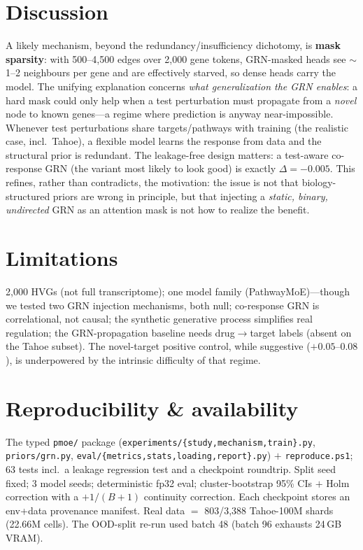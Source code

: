 \documentclass[11pt]{article}
\begin{document}
\section{Discussion}
A likely mechanism, beyond the redundancy/insufficiency dichotomy, is \textbf{mask sparsity}: with
500--4{,}500 edges over 2{,}000 gene tokens, GRN-masked heads see $\sim$1--2 neighbours per gene and are
effectively starved, so dense heads carry the model. The unifying explanation concerns \emph{what
generalization the GRN enables}: a hard mask could only help when a test perturbation must propagate from
a \emph{novel} node to known genes---a regime where prediction is anyway near-impossible. Whenever test
perturbations share targets/pathways with training (the realistic case, incl.\ Tahoe), a flexible model
learns the response from data and the structural prior is redundant. The leakage-free design matters: a
test-aware co-response GRN (the variant most likely to look good) is exactly $\Delta=-0.005$. This
refines, rather than contradicts, the motivation: the issue is not that biology-structured priors are
wrong in principle, but that injecting a \emph{static, binary, undirected} GRN as an attention mask is
not how to realize the benefit.

\section{Limitations}
2{,}000 HVGs (not full transcriptome); one model family (PathwayMoE)---though we tested two GRN injection
mechanisms, both null; co-response GRN is correlational, not causal; the synthetic generative process
simplifies real regulation; the GRN-propagation baseline needs drug$\rightarrow$target labels (absent on
the Tahoe subset). The novel-target positive control, while suggestive ($+0.05$--$0.08$), is
underpowered by the intrinsic difficulty of that regime.

\section{Reproducibility \& availability}\label{sec:repro}
The typed \texttt{pmoe/} package (\texttt{experiments/\{study,mechanism,train\}.py},
\texttt{priors/grn.py}, \texttt{eval/\{metrics,stats,loading,report\}.py}) $+$ \texttt{reproduce.ps1};
63 tests incl.\ a leakage regression test and a checkpoint roundtrip. Split seed fixed; 3 model seeds;
deterministic fp32 eval; cluster-bootstrap 95\% CIs $+$ Holm correction with a $+1/(B+1)$ continuity
correction. Each checkpoint stores an env+data provenance manifest. Real data $=$ 803/3{,}388
Tahoe-100M shards (22.66M cells). The OOD-split re-run used batch 48 (batch 96 exhausts 24\,GB VRAM).
\end{document}
